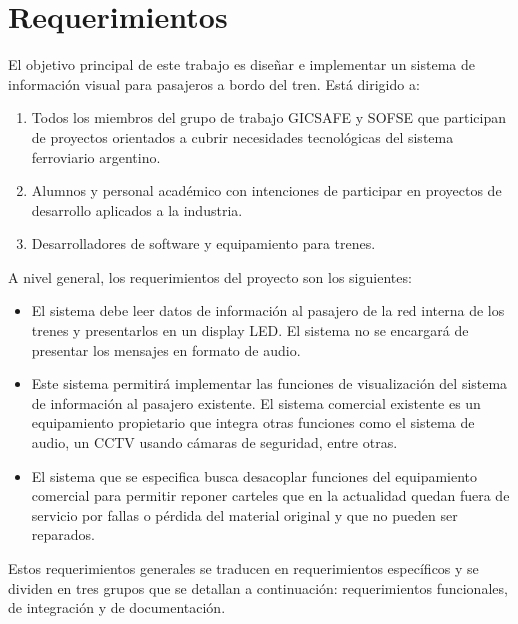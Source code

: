 \section{Requerimientos}

 El objetivo principal de este trabajo es diseñar e implementar un sistema de información visual para pasajeros a bordo del tren. Está dirigido a:
\begin{enumerate}
\item Todos los  miembros del grupo de trabajo GICSAFE y SOFSE que participan de proyectos orientados a cubrir necesidades tecnológicas del sistema ferroviario argentino.
\item Alumnos y personal académico con intenciones de participar en proyectos de desarrollo aplicados a la industria.
\item Desarrolladores de software y equipamiento para trenes.
\end{enumerate}

A nivel general, los requerimientos del proyecto son los siguientes:

\begin{itemize}

\item El sistema debe leer datos de información al pasajero de la red interna de los trenes y presentarlos en un display LED. El sistema no se encargará de presentar los mensajes en formato de audio.

\item Este sistema permitirá implementar las funciones de visualización del sistema de información al pasajero existente. El sistema comercial existente es un equipamiento propietario que integra otras funciones como el sistema de audio, un CCTV usando cámaras de seguridad, entre otras. 

\item El sistema que se especifica busca desacoplar funciones del equipamiento comercial para permitir reponer carteles que en la actualidad quedan fuera de servicio por fallas o pérdida del material original y que no pueden ser reparados. 

\end{itemize}

Estos requerimientos generales se traducen en requerimientos específicos y se dividen en tres grupos que se detallan a continuación: requerimientos funcionales, de integración y de documentación. 

